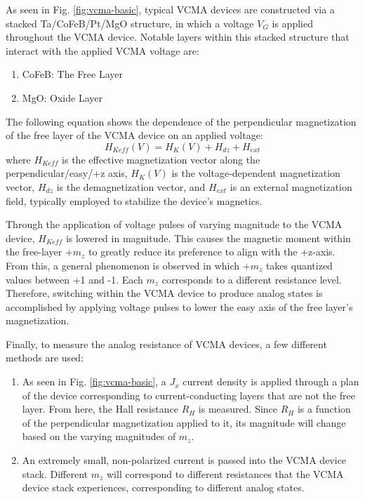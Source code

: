 \documentclass[conference]{IEEEtran}
\begin{document}
As seen in Fig. \ref{fig:vcma-basic}, typical VCMA devices are constructed via a stacked Ta/CoFeB/Pt/MgO structure, in which a voltage $V_G$ is applied throughout the VCMA device. Notable layers within this stacked structure that interact with the applied VCMA voltage are:
\begin{enumerate}
    \item CoFeB: The Free Layer
    \item MgO: Oxide Layer
\end{enumerate}


The following equation shows the dependence of the perpendicular magnetization of the free layer of the VCMA device on an applied voltage:
\begin{equation}
\label{Test}
H_{Keff}(V) = H_K(V) + H_{dz} + H_{ext}
\end{equation}
where $H_{Keff}$ is the effective magnetization vector along the perpendicular/easy/+z axis, $H_K(V)$ is the voltage-dependent magnetization vector, $H_{dz}$ is the demagnetization vector, and $H_{ext}$ is an external magnetization field, typically employed to stabilize the device's magnetics. 

Through the application of voltage pulses of varying magnitude to the VCMA device, $H_{Keff}$ is lowered in magnitude. This causes the magnetic moment within the free-layer $+m_z$ to greatly reduce its preference to align with the +z-axis. From this, a general phenomenon is observed in which $+m_z$ takes quantized values between +1 and -1. Each $m_z$ corresponds to a different resistance level. Therefore, switching within the VCMA device to produce analog states is accomplished by applying voltage pulses to lower the easy axis of the free layer's magnetization.

Finally, to measure the analog resistance of VCMA devices, a few different methods are used:

\begin{enumerate}
    \item As seen in Fig. \ref{fig:vcma-basic}, a ${J_x}$ current density is applied through a plan of the device corresponding to current-conducting layers that are not the free layer. From here, the Hall resistance $R_H$ is measured. Since $R_H$ is a function of the perpendicular magnetization applied to it, its magnitude will change based on the varying magnitudes of $m_z$.
    \item An extremely small, non-polarized current is passed into the VCMA device stack. Different $m_z$ will correspond to different resistances that the VCMA device stack experiences, corresponding to different analog states.
\end{enumerate}
\end{document}

